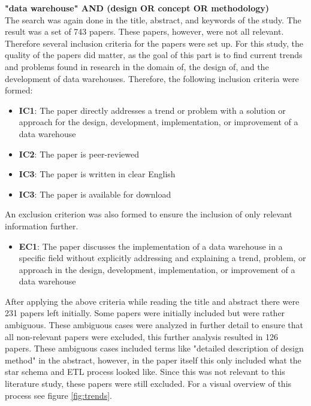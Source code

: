\documentclass[11pt]{article}
\begin{document}
\textbf{"data warehouse" AND  (design OR concept OR methodology)}\\

The search was again done in the title, abstract, and keywords of the study. The result was a set of 743 papers. These papers, however, were not all relevant. Therefore several inclusion criteria for the papers were set up. For this study, the quality of the papers did matter, as the goal of this part is to find current trends and problems found in research in the domain of, the design of, and the development of data warehouses. Therefore, the following inclusion criteria were formed:

\begin{itemize}
    \item \textbf{IC1}: The paper directly addresses a trend or problem with a solution or approach for the design, development, implementation, or improvement of a data warehouse
    \item \textbf{IC2}: The paper is peer-reviewed
    \item \textbf{IC3}: The paper is written in clear English
    \item \textbf{IC3}: The paper is available for download
\end{itemize}

An exclusion criterion was also formed to ensure the inclusion of only relevant information further.
\begin{itemize}
    \item \textbf{EC1}: The paper discusses the implementation of a data warehouse in a specific field without explicitly addressing and explaining a trend, problem, or approach in the design, development, implementation, or improvement of a data warehouse
\end{itemize}

After applying the above criteria while reading the title and abstract there were 231 papers left initially. Some papers were initially included but were rather ambiguous. These ambiguous cases were analyzed in further detail to ensure that all non-relevant papers were excluded, this further analysis resulted in 126 papers. These ambiguous cases included terms like "detailed description of design method" in the abstract, however, in the paper itself this only included what the star schema and ETL process looked like. Since this was not relevant to this literature study, these papers were still excluded. For a visual overview of this process see figure \ref{fig:trends}.\\
\end{document}
